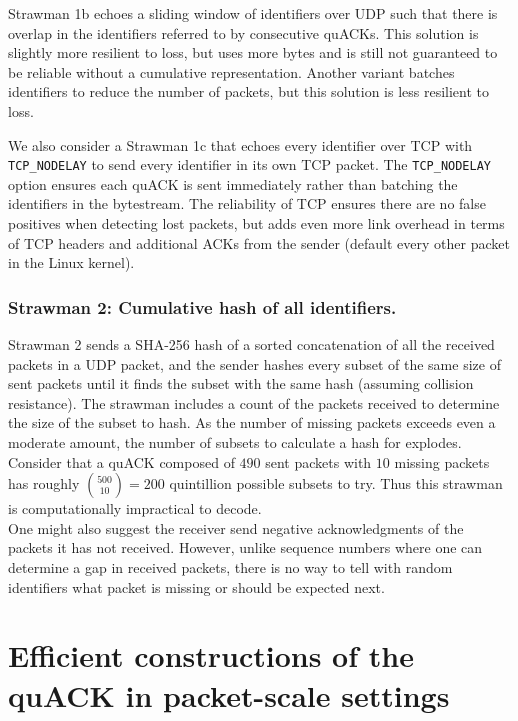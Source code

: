 Strawman 1b echoes a sliding window of identifiers over UDP such that there is
overlap in the identifiers referred to by consecutive quACKs.
This solution is slightly more resilient to loss, but uses more bytes and is
still not guaranteed to be reliable without a cumulative representation.
Another variant batches identifiers to reduce the number of packets, but this
solution is less resilient to loss.

We also consider a Strawman 1c that echoes every identifier over TCP with
\texttt{TCP\_NODELAY} to send every identifier in its own TCP packet.
The \texttt{TCP\_NODELAY} option ensures each quACK is sent immediately
rather than batching the identifiers in the bytestream. The reliability of TCP
ensures there are no false positives when detecting lost packets,
but adds even more link overhead in terms of TCP headers and additional ACKs
from the sender (default every other packet in the Linux kernel).

\subsubsection{Strawman 2: Cumulative hash of all identifiers.}
Strawman 2 sends a SHA-256 hash of a sorted concatenation of all the received
packets in a UDP packet, and the sender hashes every subset of the same size of
sent packets until it finds the subset with the same hash (assuming collision
resistance). The strawman includes a count of the packets received to determine
the size of the subset to hash. As the number of missing packets exceeds even a
moderate amount, the number of subsets to calculate a hash for explodes.
Consider that a quACK composed of $490$ sent packets with $10$ missing packets
has roughly $\binom{500}{10} = 200$ quintillion possible subsets to try.
Thus this strawman is computationally impractical to decode.\\

\noindent
One might also suggest the receiver send negative acknowledgments of the packets
it has not received. However, unlike sequence numbers where one can
determine a gap in received packets, there is no way to tell with random
identifiers what packet is missing or should be expected next.

\section{Efficient constructions of the quACK in packet-scale settings}
\label{sec:quack:constructions}

